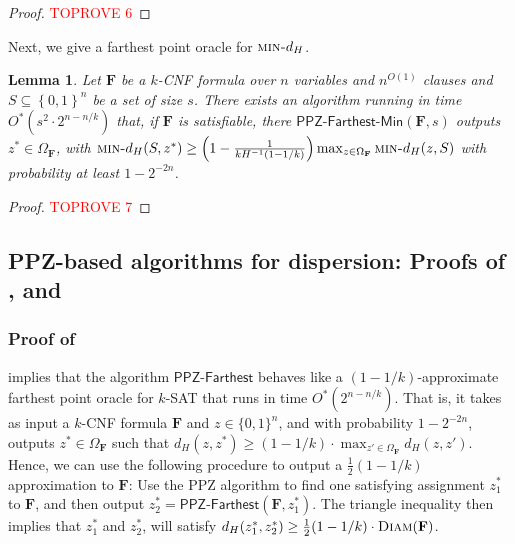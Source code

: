 \documentclass[11pt, letterpaper]{article}
\newtheorem{lemma}[theorem]{Lemma}
\theoremstyle{definition}
\newcommand{\set}[1]{\left \{ #1 \right \}}
\newcommand{\Q}[1]{\{0,1\}^{#1}}
\newcommand{\f}{\mathbf{F}}
\newcommand{\Om}{\Omega_{\f}}
\newcommand{\mind}{\textsc{min-}d_H}
\newcommand{\D}{\textsc{Diam}}
\begin{document}
 \begin{proof}\textcolor{red}{TOPROVE 6}\end{proof}
 \medskip 
 Next, we give a farthest point oracle for $\mind$.
 \begin{lemma} \label{lem:PPZFarthestMin}
     Let $\f$ be a $k$-CNF formula over $n$ variables and $n^{O(1)}$ clauses and $S \subseteq \set{0,1}^n$ be a set of size $s$. There exists an algorithm running in time $O^*(s^2 \cdot 2^{n-n/k})$ that, if $\f$ is satisfiable, there $\textsf{PPZ-Farthest-Min}(\f,s)$ outputs $z^* \in \Om$, with $\mind(S,z^*) \geq \left(1-\frac{1}{kH^{-1}(1-1/k)}\right) \max_{z \in \Om} \mind(z, S)$ with probability at least $1-2^{-2n}$. 
 \end{lemma}
 
 \begin{proof}\textcolor{red}{TOPROVE 7}\end{proof}
 \subsection{PPZ-based algorithms for dispersion: Proofs of ,  and } \label{sec:finalppz}  
 
 \subsubsection*{Proof of } implies that the algorithm $\textsf{PPZ-Farthest}$ behaves like a $(1-1/k)$-approximate farthest point oracle for $k$-SAT that runs in time $O^*(2^{n-n/k})$. That is, it takes as input a $k$-CNF formula $\f$ and $z \in \Q{n}$, and with probability $1-2^{-2n}$, outputs $z^* \in \Om$ such that $d_H(z, z^*) \geq (1-1/k) \cdot \max_{z' \in \Om} d_H(z,z')$. Hence, we can use the following procedure to output a $\frac{1}{2} \left(1-1/k\right)$ approximation to $\f$: Use the PPZ algorithm to find one satisfying assignment $z_1^*$ to $\f$, and then output $z_2^*=\textsf{PPZ-Farthest}(\f, z_1^*)$. The triangle inequality then implies that $z_1^*$ and $z_2^*$, will satisfy $d_H(z_1^*, z_2^*) \geq \frac{1}{2} (1-1/k) \cdot \D(\f)$.
\end{document}
